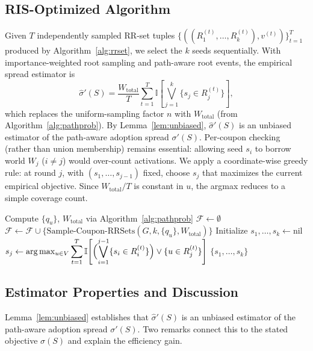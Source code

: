 \documentclass[sigconf]{acmart}
\begin{document}
\subsection{RIS-Optimized Algorithm}

Given $T$ independently sampled RR-set tuples $\{((R_1^{(t)},\ldots,R_k^{(t)}), v^{(t)})\}_{t=1}^{T}$ produced by Algorithm~\ref{alg:rrset}, we select the $k$ seeds sequentially. With importance-weighted root sampling and path-aware root events, the empirical spread estimator is
\[
  \hat{\sigma}'(S) = \frac{W_{\mathrm{total}}}{T}\sum_{t=1}^{T}
    \mathbb{I}\!\left[\bigvee_{j=1}^{k} \bigl\{s_j \in R_j^{(t)}\bigr\}\right],
\]
which replaces the uniform-sampling factor $n$ with $W_{\mathrm{total}}$ (from Algorithm~\ref{alg:pathprob}). By Lemma~\ref{lem:unbiased}, $\hat{\sigma}'(S)$ is an unbiased estimator of the path-aware adoption spread $\sigma'(S)$. Per-coupon checking (rather than union membership) remains essential: allowing seed $s_i$ to borrow world $W_j$ ($i \neq j$) would over-count activations. We apply a coordinate-wise greedy rule: at round $j$, with $(s_1,\ldots,s_{j-1})$ fixed, choose $s_j$ that maximizes the current empirical objective. Since $W_{\mathrm{total}}/T$ is constant in $u$, the argmax reduces to a simple coverage count.

\begin{algorithm}[t]
\caption{RIS-Optimized$(G, k, T)$}
\label{alg:risopt}
\begin{algorithmic}[1]
\State Compute $\{q_u\}$, $W_{\mathrm{total}}$ via Algorithm~\ref{alg:pathprob}
\State $\mathcal{F} \leftarrow \emptyset$
  \State $\mathcal{F} \leftarrow \mathcal{F} \cup \{\text{Sample-Coupon-RRSets}(G, k, \{q_u\}, W_{\mathrm{total}})\}$
\EndFor
\State Initialize $s_1, \ldots, s_k \leftarrow \mathrm{nil}$
  \State $s_j \leftarrow \arg\max_{u \in V}
    \displaystyle\sum_{t=1}^{T}
    \mathbb{I}\!\left[
      \Bigl(\bigvee_{i=1}^{j-1}\{s_i \in R_i^{(t)}\}\Bigr)
      \vee \{u \in R_j^{(t)}\}
    \right]$
\EndFor
\State \Return $\{s_1, \ldots, s_k\}$
\end{algorithmic}
\end{algorithm}

\subsection{Estimator Properties and Discussion}

Lemma~\ref{lem:unbiased} establishes that $\hat{\sigma}'(S)$ is an unbiased estimator of the path-aware adoption spread $\sigma'(S)$. Two remarks connect this to the stated objective $\sigma(S)$ and explain the efficiency gain.
\end{document}

